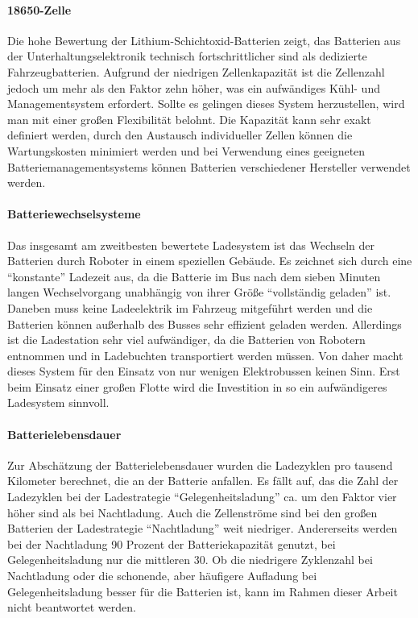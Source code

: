 \paragraph{18650-Zelle} Die hohe Bewertung der Lithium-Schichtoxid-Batterien zeigt, das Batterien aus der Unterhaltungselektronik technisch fortschrittlicher sind als dedizierte Fahrzeugbatterien. Aufgrund der niedrigen Zellenkapazität ist die Zellenzahl jedoch um mehr als den Faktor zehn höher, was ein aufwändiges Kühl- und Managementsystem erfordert. Sollte es gelingen dieses System herzustellen, wird man mit einer großen Flexibilität belohnt. Die Kapazität kann sehr exakt definiert werden, durch den Austausch individueller Zellen können die Wartungskosten minimiert werden und bei Verwendung eines geeigneten Batteriemanagementsystems können Batterien verschiedener Hersteller verwendet werden.

\paragraph{Batteriewechselsysteme} Das insgesamt am zweitbesten bewertete Ladesystem ist das Wechseln der Batterien durch Roboter in einem speziellen Gebäude. Es zeichnet sich durch eine "`konstante"' Ladezeit aus, da die Batterie im Bus nach dem sieben Minuten langen Wechselvorgang unabhängig von ihrer Größe "`vollständig geladen"' ist. Daneben muss keine Ladeelektrik im Fahrzeug mitgeführt werden und die Batterien können außerhalb des Busses sehr effizient geladen werden. Allerdings ist die Ladestation sehr viel aufwändiger, da die Batterien  von Robotern entnommen und in Ladebuchten transportiert werden müssen. Von daher macht dieses System für den Einsatz von nur wenigen Elektrobussen keinen Sinn. Erst beim Einsatz einer großen Flotte wird die Investition in so ein aufwändigeres Ladesystem sinnvoll.

\paragraph{Batterielebensdauer} Zur Abschätzung der Batterielebensdauer wurden die Ladezyklen pro tausend Kilometer berechnet, die an der Batterie anfallen. Es fällt auf, das die Zahl der Ladezyklen bei der Ladestrategie "`Gelegenheitsladung"' ca. um den Faktor vier höher sind als bei Nachtladung. Auch die Zellenströme sind bei den großen Batterien der Ladestrategie "`Nachtladung"' weit niedriger. Andererseits werden bei der Nachtladung 90 Prozent der Batteriekapazität genutzt, bei Gelegenheitsladung nur die mittleren 30. Ob die niedrigere Zyklenzahl bei Nachtladung oder die schonende, aber häufigere Aufladung bei Gelegenheitsladung besser für die Batterien ist, kann im Rahmen dieser Arbeit nicht beantwortet werden.

